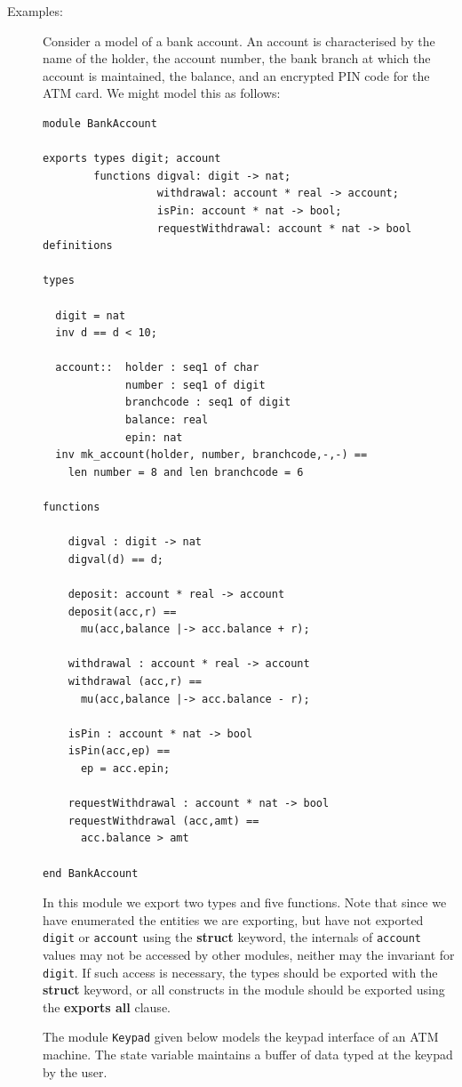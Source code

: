 \documentclass{overturerepchap}
\newcommand{\keyw}[1]{{\bf\ttfamily #1}}
\begin{document}
\begin{description}
\item[Examples:] Consider a model of a bank account. An account is
characterised by the name of the holder, the account number, the
bank branch at which the account is maintained, the balance, and an
encrypted PIN code for the ATM card. We might model this as follows:
\begin{lstlisting}
module BankAccount

exports types digit; account
        functions digval: digit -> nat;
                  withdrawal: account * real -> account;
                  isPin: account * nat -> bool;
                  requestWithdrawal: account * nat -> bool
definitions

types

  digit = nat
  inv d == d < 10;
  
  account::  holder : seq1 of char
             number : seq1 of digit
             branchcode : seq1 of digit
             balance: real
             epin: nat
  inv mk_account(holder, number, branchcode,-,-) ==
    len number = 8 and len branchcode = 6

functions

    digval : digit -> nat
    digval(d) == d;

    deposit: account * real -> account
    deposit(acc,r) == 
      mu(acc,balance |-> acc.balance + r);

    withdrawal : account * real -> account
    withdrawal (acc,r) == 
      mu(acc,balance |-> acc.balance - r);

    isPin : account * nat -> bool
    isPin(acc,ep) ==
      ep = acc.epin;

    requestWithdrawal : account * nat -> bool
    requestWithdrawal (acc,amt) ==
      acc.balance > amt

end BankAccount
\end{lstlisting}
In this module we export two types and five functions. Note that since
we have enumerated the entities we are exporting, but have not
exported \texttt{digit} or \texttt{account} using the \keyw{struct}
keyword, the internals of \texttt{account} values may not be accessed
by other modules, neither may the invariant for \texttt{digit}. If 
such access is necessary, the types should be exported with the
\keyw{struct} keyword, or all constructs in the module should be
exported using the \keyw{exports all} clause.

The module \texttt{Keypad} given below models the keypad interface of
an ATM machine. The state variable maintains a buffer of data typed at
the keypad by the user.


\end{description}
\end{document}
